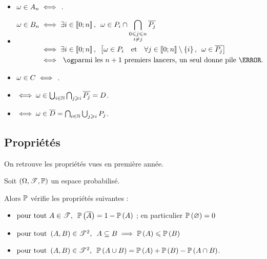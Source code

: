 \begin{corr}
\begin{itemize}
    \item \(\omega\in A_n\iff\) . \\
    \item \[\begin{aligned}
        \omega\in B_n&\ssi\quantifs{\exists i\in\interventierii{0}{n}}\omega\in P_i\inter\biginter_{\substack{0\leq j\leq n \\ i\not=j}}\conj{P_j} \\
        &\ssi\quantifs{\exists i\in\interventierii{0}{n}}\croch{\omega\in P_i\quad\text{et}\quad\quantifs{\forall j\in\interventierii{0}{n}\excluant\accol{i}}\omega\in\conj{P_j}} \\
        &\ssi\text{ \guillemets{parmi les \(n+1\) premiers lancers, un seul donne pile}}.
    \end{aligned}\]
    \item \(\omega\in C\iff\) . \\
    \item {} \(\iff\omega\in\bigcup_{i\in\mathbb{N}}\bigcap_{j\geqslant i}\overline{P_j}=D\). \\
    \item {} \(\iff\omega\in\overline{D}=\bigcap_{i\in\mathbb{N}}\bigcup_{j\geqslant i}P_j\).
\end{itemize}
\end{corr}

\subsection{Propriétés}

On retrouve les propriétés vues en première année.

\begin{prop}
Soit \(\anneau{\Omega}[\fami{T}][\prem]\) un espace probabilisé.

Alors \(\mathbb{P}\) vérifie les propriétés suivantes :

\begin{itemize}
    \item \(\quantifs{\tpt A\in\fami{T}}\proba{\overline{A}}=1-\proba{A}\) ; en particulier \(\mathbb{P}\left(\varnothing\right)=0\) \\
    \item \(\quantifs{\tpt\paren{A,B}\in\fami{T}^2}A\subset B\imp\proba{A}\leq\proba{B}\) \\
    \item \(\quantifs{\tpt\paren{A,B}\in\fami{T}^2}\proba{A\union B}=\proba{A}+\proba{B}-\proba{A\inter B}\).
\end{itemize}
\end{prop}

